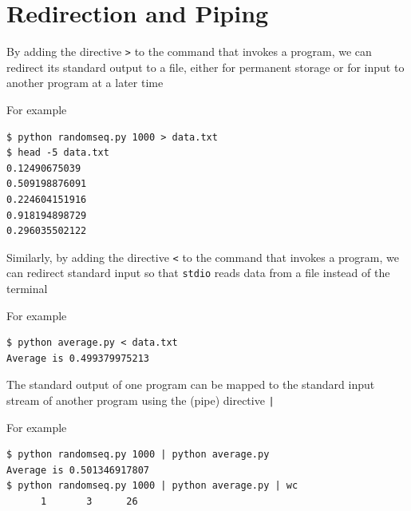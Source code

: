 \documentclass[8pt,a4paper,compress]{beamer}
\begin{document}
\section{Redirection and Piping}
\begin{frame}[fragile]
\pause

By adding the directive \lstinline{>} to the command that invokes a program, we can redirect its standard output to a file, either for permanent storage or for input to another program at a later time

\pause
\bigskip

For example
\begin{lstlisting}[language={}]
$ python randomseq.py 1000 > data.txt
$ head -5 data.txt 
0.12490675039
0.509198876091
0.224604151916
0.918194898729
0.296035502122
\end{lstlisting}

\pause
\bigskip

Similarly, by adding the directive \lstinline{<} to the command that invokes a program, we can redirect standard input so that \lstinline{stdio} reads data from a file instead of the terminal

\pause
\bigskip

For example
\begin{lstlisting}[language={}]
$ python average.py < data.txt
Average is 0.499379975213
\end{lstlisting}

\pause
\bigskip

The standard output of one program can be mapped to the standard input stream of another program using the (pipe) directive \lstinline{|}

\pause
\bigskip

For example
\begin{lstlisting}[language={}]
$ python randomseq.py 1000 | python average.py 
Average is 0.501346917807
$ python randomseq.py 1000 | python average.py | wc
      1       3      26
\end{lstlisting}
\end{frame}
\end{document}

